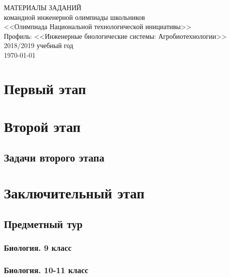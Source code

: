 \documentclass[a4paper,12pt,oneside]{book}
\begin{document}
\begin{titlepage}
    \begin{center}
        \huge{МАТЕРИАЛЫ ЗАДАНИЙ} \\
        \Large{командной инженерной олимпиады школьников} \\
        \Large{<<Олимпиада Национальной технологической инициативы>>} \\
        \Large{Профиль: <<Инженерные биологические системы: Агробиотехнологии>>} \\
        \large{2018/2019 учебный год} \\
        \vspace{2cm}
        \Large{\today}  
    \end{center}
\end{titlepage}

\setcounter{tocdepth}{1}

\tableofcontents

\part{Первый этап}




\part{Второй этап}
\clearpage
\chapter{Задачи второго этапа}



\part{Заключительный этап}

\clearpage
\chapter{Предметный тур}

\section{Биология. 9 класс}


\section{Биология. 10-11 класс}


%
%
\end{document}
